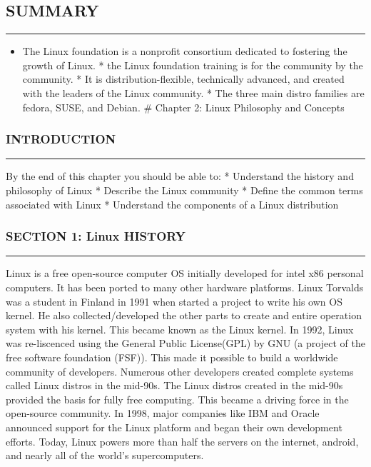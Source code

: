 \subsection{SUMMARY}\label{summary}

\begin{center}\rule{3in}{0.4pt}\end{center}

\begin{itemize}
\itemsep1pt\parskip0pt
\item
  The Linux foundation is a nonprofit consortium dedicated to fostering
  the growth of Linux. * the Linux foundation training is for the
  community by the community. * It is distribution-flexible, technically
  advanced, and created with the leaders of the Linux community. * The
  three main distro families are fedora, SUSE, and Debian. \# Chapter 2:
  Linux Philosophy and Concepts
\end{itemize}

\subsubsection{INTRODUCTION}\label{introduction-1}

\begin{center}\rule{3in}{0.4pt}\end{center}

By the end of this chapter you should be able to: * Understand the
history and philosophy of Linux * Describe the Linux community * Define
the common terms associated with Linux * Understand the components of a
Linux distribution

\subsubsection{SECTION 1: Linux HISTORY}\label{section-1-linux-history}

\begin{center}\rule{3in}{0.4pt}\end{center}

Linux is a free open-source computer OS initially developed for intel
x86 personal computers. It has been ported to many other hardware
platforms. Linux Torvalds was a student in Finland in 1991 when started
a project to write his own OS kernel. He also collected/developed the
other parts to create and entire operation system with his kernel. This
became known as the Linux kernel. In 1992, Linux was re-liscenced using
the General Public License(GPL) by GNU (a project of the free software
foundation (FSF)). This made it possible to build a worldwide community
of developers. Numerous other developers created complete systems called
Linux distros in the mid-90s. The Linux distros created in the mid-90s
provided the basis for fully free computing. This became a driving force
in the open-source community. In 1998, major companies like IBM and
Oracle announced support for the Linux platform and began their own
development efforts. Today, Linux powers more than half the servers on
the internet, android, and nearly all of the world's supercomputers.

